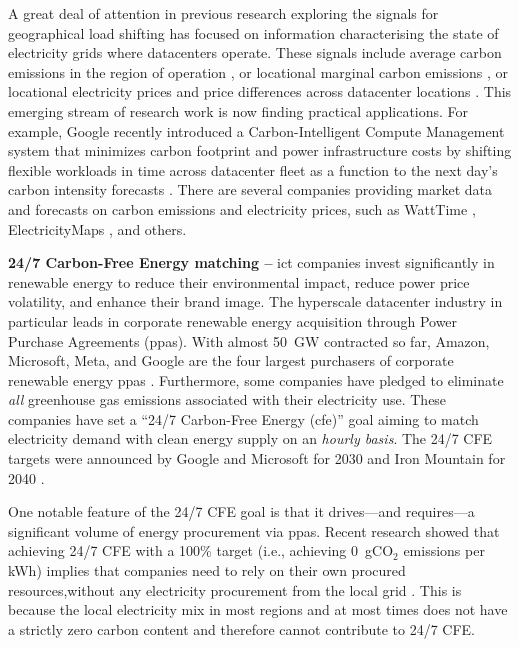 A great deal of attention in previous research exploring the signals for geographical load shifting has focused on information characterising the state of electricity grids where datacenters operate. These signals include average carbon emissions in the region of operation \cite{zhengMitigatingCurtailmentCarbon2020}, or locational marginal carbon emissions \cite{lindbergEnvironmentalPotentialHyperScale2021}, or locational electricity prices and price differences across datacenter locations \cite{raoMinimizingElectricityCost2010,tranHowGeoDistributedData2016, zhangRemuneratingSpaceTime2022}. This emerging stream of research work is now finding practical applications. For example, Google recently introduced a Carbon-Intelligent Compute Management system that minimizes carbon footprint and power infrastructure costs by shifting flexible workloads in time  across datacenter fleet as a function to the next day's carbon intensity forecasts \cite{radovanovicIEEE2023}. There are several companies providing market data and forecasts on carbon emissions and electricity prices, such as WattTime \cite{WattTime}, ElectricityMaps \cite{ElectricityMaps}, and others.

\textbf{24/7 Carbon-Free Energy matching --} \gls{ict} companies invest significantly in renewable energy to reduce their environmental impact, reduce power price volatility, and enhance their brand image. The hyperscale datacenter industry in particular leads in corporate renewable energy acquisition through Power Purchase Agreements (\gls{ppa}s). With almost 50~GW contracted so far, Amazon, Microsoft, Meta, and Google are the four largest purchasers of corporate renewable energy \gls{ppa}s \cite{ieaDataCentresData2023}. Furthermore, some companies have pledged to eliminate \textit{all} greenhouse gas emissions associated with their electricity use. These companies have set a \enquote{24/7 Carbon-Free Energy (\gls{cfe})} goal aiming to match electricity demand with clean energy supply on an \textit{hourly basis}. The 24/7 CFE targets were announced by Google and Microsoft for 2030 and Iron Mountain for 2040 \cite{google-247by2030, Microsoft-vision, IronMountainSustainability}.

One notable feature of the 24/7 CFE goal is that it drives---and requires---a significant volume of energy procurement via \gls{ppa}s. Recent research showed that achieving 24/7 CFE with a 100\% target (i.e., achieving 0~gCO$_2$ emissions per kWh) implies that companies need to rely on their own procured resources,without any electricity procurement from the local grid \cite{riepinMeansCostsSystemlevel2023, riepin-zenodo-systemlevel247}. This is because the local electricity mix in most regions and at most times does not have a strictly zero carbon content and therefore cannot contribute to 24/7 CFE.


